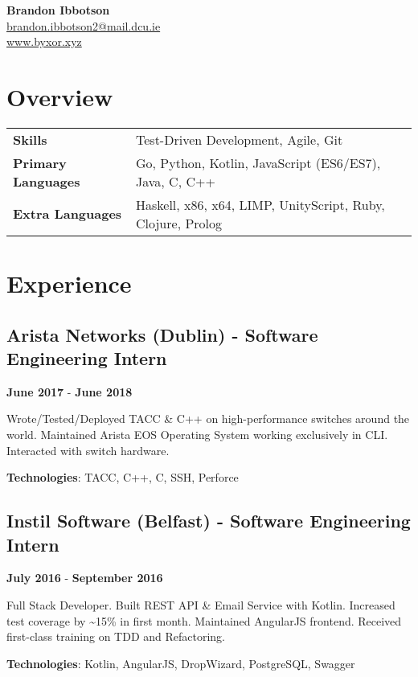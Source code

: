 \documentclass{article}
\newcommand{\youremail}[1]{\href{mailto:#1}{#1}}
\newcommand{\yourtitle}[3]{
  \begin{center}
    {\huge\bfseries #1}\\
    \vspace{.5em}
    \youremail{#2}\\
    \url{#3}\\
    \vspace{.7em}
  \end{center}
}
\begin{document}
\yourtitle{Brandon Ibbotson}{brandon.ibbotson2@mail.dcu.ie}{www.byxor.xyz}
\section{Overview}
\begin{tabularx}{\textwidth}{ll}
\vspace{0.75em}
\textbf{Skills} & Test-Driven Development, Agile, Git\\
\vspace{0.75em}
\textbf{Primary Languages} & Go, Python, Kotlin, JavaScript (ES6/ES7), Java, C, C++\\
\textbf{Extra Languages} & Haskell, x86, x64, LIMP, UnityScript, Ruby, Clojure, Prolog\\
\end{tabularx}
\section{Experience}
\subsection{Arista Networks (Dublin) - Software Engineering Intern}
\textbf{June 2017} - \textbf{June 2018}

Wrote/Tested/Deployed TACC \& C++ on high-performance switches around the world. Maintained Arista EOS Operating System working exclusively in CLI. Interacted with switch hardware.

\textbf{Technologies}: TACC, C++, C, SSH, Perforce
\vspace{0.5em}
\subsection{Instil Software (Belfast) - Software Engineering Intern}
\textbf{July 2016} - \textbf{September 2016}

Full Stack Developer. Built REST API \& Email Service with Kotlin. Increased test coverage by \textasciitilde{}15\% in first month. Maintained AngularJS frontend. Received first-class training on TDD and Refactoring.

\textbf{Technologies}: Kotlin, AngularJS, DropWizard, PostgreSQL, Swagger
\vspace{0.5em}
\end{document}
